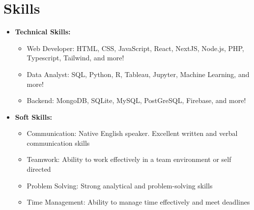 \section{Skills}

\begin{itemize}
  \item \textbf{Technical Skills:}
  \begin{itemize}
    \item Web Developer: HTML, CSS, JavaScript, React, NextJS, Node.js, PHP, Typescript, Tailwind, and more!
    \item Data Analyst: SQL, Python, R, Tableau, Jupyter, Machine Learning, and more!
    \item Backend: MongoDB, SQLite, MySQL, PostGreSQL, Firebase, and more!
  \end{itemize}
  \item \textbf{Soft Skills:}
    \begin{itemize}
      \item Communication: Native English speaker. Excellent written and verbal communication skills
      \item Teamwork: Ability to work effectively in a team environment or self directed
      \item Problem Solving: Strong analytical and problem-solving skills
      \item Time Management: Ability to manage time effectively and meet deadlines
    \end{itemize}
\end{itemize}

